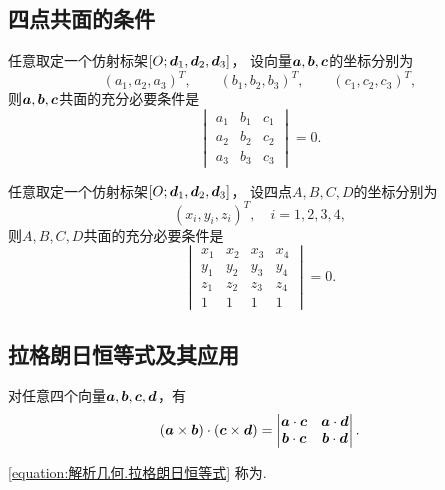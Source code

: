 \subsection{四点共面的条件}
\begin{theorem}
任意取定一个仿射标架\([O;\boldsymbol{d}_1,\boldsymbol{d}_2,\boldsymbol{d}_3]\)，
设向量\(\boldsymbol{a},\boldsymbol{b},\boldsymbol{c}\)的坐标分别为\[
	(a_1,a_2,a_3)^T, \qquad
	(b_1,b_2,b_3)^T, \qquad
	(c_1,c_2,c_3)^T,
\]
则\(\boldsymbol{a},\boldsymbol{b},\boldsymbol{c}\)共面的充分必要条件是\[
	\begin{vmatrix}
		a_1 & b_1 & c_1 \\
		a_2 & b_2 & c_2 \\
		a_3 & b_3 & c_3
	\end{vmatrix} = 0.
\]
\end{theorem}

\begin{corollary}
任意取定一个仿射标架\([O;\boldsymbol{d}_1,\boldsymbol{d}_2,\boldsymbol{d}_3]\)，
设四点\(A,B,C,D\)的坐标分别为\[
	(x_i,y_i,z_i)^T,
	\quad i=1,2,3,4,
\]
则\(A,B,C,D\)共面的充分必要条件是\[
	\begin{vmatrix}
		x_1 & x_2 & x_3 & x_4 \\
		y_1 & y_2 & y_3 & y_4 \\
		z_1 & z_2 & z_3 & z_4 \\
		1 & 1 & 1 & 1
	\end{vmatrix} = 0.
\]
\end{corollary}

\subsection{拉格朗日恒等式及其应用}
\begin{theorem}
对任意四个向量\(\boldsymbol{a},\boldsymbol{b},\boldsymbol{c},\boldsymbol{d}\)，有
\begin{equation}\label{equation:解析几何.拉格朗日恒等式}
	(\boldsymbol{a}\times\boldsymbol{b})\cdot(\boldsymbol{c}\times\boldsymbol{d})
	= \begin{vmatrix}
		\boldsymbol{a}\cdot\boldsymbol{c} & \boldsymbol{a}\cdot\boldsymbol{d} \\
		\boldsymbol{b}\cdot\boldsymbol{c} & \boldsymbol{b}\cdot\boldsymbol{d}
	\end{vmatrix}.
\end{equation}
\end{theorem}
\cref{equation:解析几何.拉格朗日恒等式}
称为.

